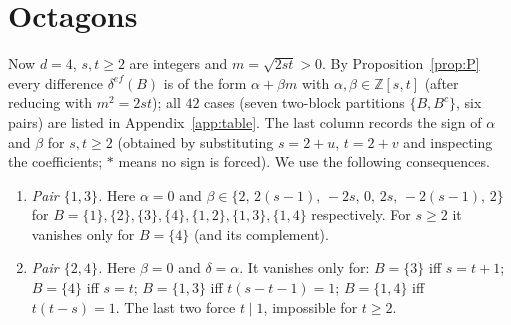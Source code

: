 \documentclass[11pt]{article}
\theoremstyle{remark}
\begin{document}
\section{Octagons}

Now $d=4$, $s,t\ge2$ are integers and $m=\sqrt{2st}>0$. By Proposition~\ref{prop:P} every difference $\delta^{ef}(B)$ is of the form $\alpha+\beta m$ with $\alpha,\beta\in\mathbb Z[s,t]$ (after reducing with $m^2=2st$); all $42$ cases (seven two-block partitions $\{B,B^c\}$, six pairs) are listed in Appendix~\ref{app:table}. The last column records the sign of $\alpha$ and $\beta$ for $s,t\ge2$ (obtained by substituting $s=2+u$, $t=2+v$ and inspecting the coefficients; $\ast$ means no sign is forced). We use the following consequences.

\begin{enumerate}
\item[(i)] \emph{Pair $\{1,3\}$.} Here $\alpha=0$ and $\beta\in\{2,\,2(s-1),\,-2s,\,0,\,2s,\,-2(s-1),\,2\}$ for $B=\{1\},\{2\},\{3\},\{4\},\{1,2\},\{1,3\},\{1,4\}$ respectively. For $s\ge2$ it vanishes only for $B=\{4\}$ (and its complement).
\item[(ii)] \emph{Pair $\{2,4\}$.} Here $\beta=0$ and $\delta=\alpha$. It vanishes only for: $B=\{3\}$ iff $s=t+1$; $B=\{4\}$ iff $s=t$; $B=\{1,3\}$ iff $t(s-t-1)=1$; $B=\{1,4\}$ iff $t(t-s)=1$. The last two force $t\mid1$, impossible for $t\ge2$.
\end{enumerate}
\end{document}
